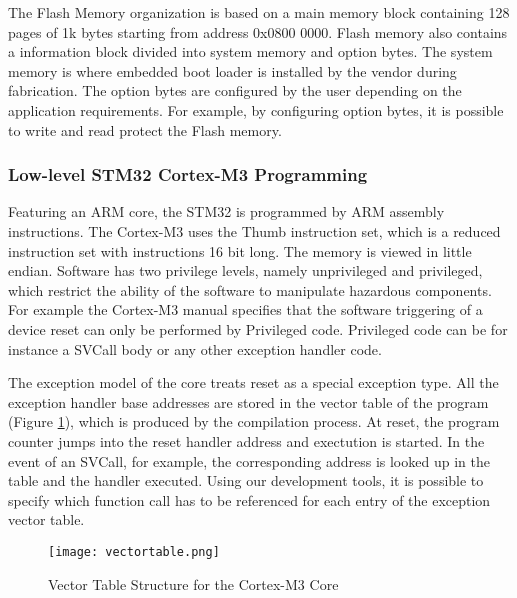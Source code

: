 \documentclass[11pt]{article} %
\begin{document}
The Flash Memory organization is based on a main memory block containing 128 pages of 1k bytes starting from address 0x0800 0000. Flash memory also contains a information block divided into system memory and option bytes. The system memory is where embedded boot loader is installed by the vendor during fabrication. The option bytes are configured by the user depending on the application requirements. For example, by configuring option bytes, it is possible to write and read protect the Flash memory.

\subsubsection{Low-level STM32 Cortex-M3 Programming}
Featuring an ARM core, the STM32 is programmed by ARM assembly instructions. The Cortex-M3 uses the Thumb instruction set, which is a reduced instruction set with instructions 16 bit long. The memory is viewed in little endian. Software has two privilege levels, namely unprivileged and privileged, which restrict the ability of the software to manipulate hazardous components. For example the Cortex-M3 manual specifies that the software triggering of a device reset can only be performed by Privileged code. Privileged code can be for instance a SVCall body or any other exception handler code.

The exception model of the core treats reset as a special exception type. All the exception handler base addresses are stored in the vector table of the program (Figure \ref{stm32vector}), which is produced by the compilation process. At reset, the program counter jumps into the reset handler address and exectution is started. In the event of an SVCall, for example, the corresponding address is looked up in the table and the handler executed. Using our development tools, it is possible to specify which function call has to be referenced for each entry of the exception vector table.

\begin{figure}[h]
\begin{center}
\texttt{[image: vectortable.png]}
\end{center}
\caption{Vector Table Structure for the Cortex-M3 Core}
\label{stm32vector}
\end{figure}
\end{document}
